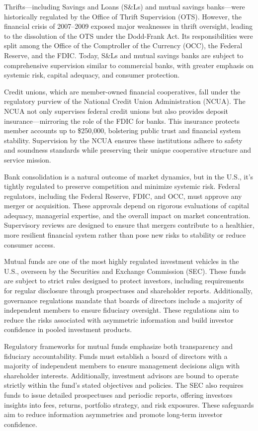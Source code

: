 Thrifts—including Savings and Loans (S\&Ls) and mutual savings banks—were historically regulated by the Office of Thrift Supervision (OTS). However, the financial crisis of 2007–2009 exposed major weaknesses in thrift oversight, leading to the dissolution of the OTS under the Dodd-Frank Act. Its responsibilities were split among the Office of the Comptroller of the Currency (OCC), the Federal Reserve, and the FDIC. Today, S\&Ls and mutual savings banks are subject to comprehensive supervision similar to commercial banks, with greater emphasis on systemic risk, capital adequacy, and consumer protection.

Credit unions, which are member-owned financial cooperatives, fall under the regulatory purview of the National Credit Union Administration (NCUA). The NCUA not only supervises federal credit unions but also provides deposit insurance—mirroring the role of the FDIC for banks. This insurance protects member accounts up to \$250,000, bolstering public trust and financial system stability. Supervision by the NCUA ensures these institutions adhere to safety and soundness standards while preserving their unique cooperative structure and service mission.

Bank consolidation is a natural outcome of market dynamics, but in the U.S., it’s tightly regulated to preserve competition and minimize systemic risk. Federal regulators, including the Federal Reserve, FDIC, and OCC, must approve any merger or acquisition. These approvals depend on rigorous evaluations of capital adequacy, managerial expertise, and the overall impact on market concentration. Supervisory reviews are designed to ensure that mergers contribute to a healthier, more resilient financial system rather than pose new risks to stability or reduce consumer access.

Mutual funds are one of the most highly regulated investment vehicles in the U.S., overseen by the Securities and Exchange Commission (SEC). These funds are subject to strict rules designed to protect investors, including requirements for regular disclosure through prospectuses and shareholder reports. Additionally, governance regulations mandate that boards of directors include a majority of independent members to ensure fiduciary oversight. These regulations aim to reduce the risks associated with asymmetric information and build investor confidence in pooled investment products.

Regulatory frameworks for mutual funds emphasize both transparency and fiduciary accountability. Funds must establish a board of directors with a majority of independent members to ensure management decisions align with shareholder interests. Additionally, investment advisors are bound to operate strictly within the fund’s stated objectives and policies. The SEC also requires funds to issue detailed prospectuses and periodic reports, offering investors insights into fees, returns, portfolio strategy, and risk exposures. These safeguards aim to reduce information asymmetries and promote long-term investor confidence.


